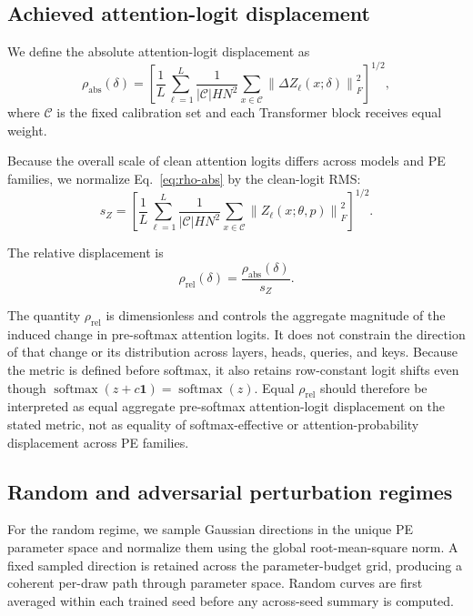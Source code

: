 \documentclass[preprint,12pt,authoryear]{elsarticle}
\begin{document}
\subsection{Achieved attention-logit displacement}

We define the absolute attention-logit displacement as
\begin{equation}
\rho_{\mathrm{abs}}(\delta)
=
\left[
\frac{1}{L}
\sum_{\ell=1}^{L}
\frac{1}{|\mathcal{C}|HN^2}
\sum_{x\in\mathcal{C}}
\left\|
\Delta Z_{\ell}(x;\delta)
\right\|_F^2
\right]^{1/2},
\label{eq:rho-abs}
\end{equation}
where $\mathcal{C}$ is the fixed calibration set and each Transformer
block receives equal weight.

Because the overall scale of clean attention logits differs across
models and PE families, we normalize Eq.~\eqref{eq:rho-abs} by the
clean-logit RMS:
\begin{equation}
s_Z
=
\left[
\frac{1}{L}
\sum_{\ell=1}^{L}
\frac{1}{|\mathcal{C}|HN^2}
\sum_{x\in\mathcal{C}}
\left\|
Z_{\ell}(x;\theta,p)
\right\|_F^2
\right]^{1/2}.
\label{eq:clean-logit-scale}
\end{equation}

The relative displacement is
\begin{equation}
\rho_{\mathrm{rel}}(\delta)
=
\frac{\rho_{\mathrm{abs}}(\delta)}{s_Z}.
\label{eq:rho-rel}
\end{equation}

The quantity $\rho_{\mathrm{rel}}$ is dimensionless and controls the
aggregate magnitude of the induced change in pre-softmax attention
logits. It does not constrain the direction of that change or its
distribution across layers, heads, queries, and keys. Because the metric is
defined before softmax, it also retains row-constant logit shifts even though
$\operatorname{softmax}(z+c\mathbf{1})=\operatorname{softmax}(z)$. Equal
$\rho_{\mathrm{rel}}$ should therefore be interpreted as equal aggregate
pre-softmax attention-logit displacement on the stated metric, not as equality
of softmax-effective or attention-probability displacement across PE families.


\subsection{Random and adversarial perturbation regimes}

For the random regime, we sample Gaussian directions in the unique
PE parameter space and normalize them using the global
root-mean-square norm. A fixed sampled direction is retained across
the parameter-budget grid, producing a coherent per-draw path through
parameter space. Random curves are first averaged within each trained
seed before any across-seed summary is computed.
\end{document}
